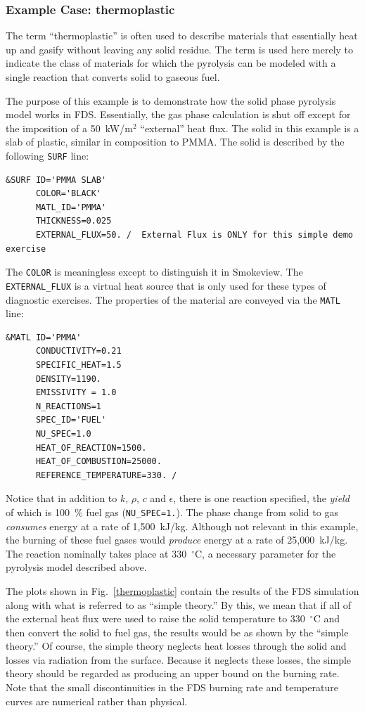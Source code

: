 \documentclass[11pt]{book}
\newcommand{\ct}{\tt\small}
\begin{document}
\subsubsection{Example Case: {\bf thermoplastic}}

The term ``thermoplastic'' is often used to describe materials that essentially heat up and gasify without leaving any solid residue. The
term is used here merely to indicate the class of materials for which the pyrolysis can be modeled with a single reaction that converts
solid to gaseous fuel.

The purpose of this example is to demonstrate how the solid phase pyrolysis model works in FDS. Essentially, the gas phase calculation is shut off except for the imposition of a 50~kW/m$^2$ ``external'' heat flux. The solid in this example is a slab of plastic, similar in composition to PMMA. The solid is described by the following {\ct SURF} line:

\scriptsize
\begin{verbatim}
&SURF ID='PMMA SLAB'
      COLOR='BLACK'
      MATL_ID='PMMA'
      THICKNESS=0.025
      EXTERNAL_FLUX=50. /  External Flux is ONLY for this simple demo exercise
\end{verbatim} \normalsize

\noindent
The {\ct COLOR} is meaningless except to distinguish it in
Smokeview. The {\ct EXTERNAL\_FLUX} is a virtual heat source that is
only used for these types of diagnostic exercises. The properties of
the material are conveyed via the {\ct MATL} line:

\scriptsize
\begin{verbatim}
&MATL ID='PMMA'
      CONDUCTIVITY=0.21
      SPECIFIC_HEAT=1.5
      DENSITY=1190.
      EMISSIVITY = 1.0
      N_REACTIONS=1
      SPEC_ID='FUEL'
      NU_SPEC=1.0
      HEAT_OF_REACTION=1500.
      HEAT_OF_COMBUSTION=25000.
      REFERENCE_TEMPERATURE=330. /
\end{verbatim} \normalsize

\noindent
Notice that in addition to $k$, $\rho$, $c$ and $\epsilon$, there is one reaction specified, the {\em yield} of which is 100~\% fuel gas ({\ct NU\_SPEC=1.}).
The phase change from solid to gas {\em consumes} energy at a rate of 1,500~kJ/kg. Although not relevant in this example, the burning of these fuel gases
would {\em produce} energy at a rate of 25,000~kJ/kg. The reaction nominally takes place at 330~$^\circ$C, a necessary parameter for the pyrolysis model described above.

The plots shown in Fig.~\ref{thermoplastic} contain the results of the FDS simulation along with
what is referred to as ``simple theory.'' By this, we mean that if all of the external heat flux were
used to raise the solid temperature to 330~$^\circ$C and then convert the solid to fuel gas,
the results would be as shown by the ``simple theory.'' Of course, the simple theory neglects heat losses
through the solid and losses via radiation from the surface. Because it neglects these losses, the
simple theory should be regarded as producing an upper bound on the burning rate. Note that the small discontinuities in the FDS burning rate
and temperature curves are numerical rather than physical.
\end{document}
